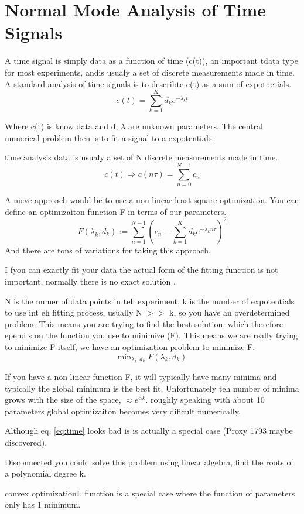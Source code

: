 \documentclass{article}
\newcommand{\be}{\begin{equation}}
\newcommand{\ee}{\end{equation}}
\begin{document}
\section{Normal Mode Analysis of Time Signals}
A time signal is simply data as a function of time (c(t)), an important tdata type for most experiments,
andis usualy a set of discrete measurements made in time.
A standard analysis of time signals is to describte c(t) as a sum of expotnetials.
\be\label{eq:time}
c(t) = \sum_{k=1}^K d_k e^{-\lambda_kt}
\ee

Where c(t) is know data and d, $\lambda$ are unknown parameters.
The central numerical problem then is to fit a signal to a expotentials.

time analysis data is usualy a set of N discrete measurements made in time.
\be
c(t) \Rightarrow c(n\tau) = \sum_{n=0}^{N-1} c_n
\ee

A nieve approach would be to use a non-linear least square optimization.
You can define an optimizaiton function F in terms of our parameters.
\be
F(\lambda_k,d_k) := \sum_{n=1}^{N-1}\left( c_n - \sum_{k=1}^K d_k e^{-\lambda_kn\tau}  \right)^2
\ee
And there are tons of variations for taking this approach.

I fyou can exactly fit your data the actual form of the fitting function is not important, normally there is no exact solution .

N is the numer of data points in teh experiment, k is the number of expotentials to use int eh fitting process, usually N $>>$ k, so you have an overdetermined problem.
This means you are trying to find the best solution, which therefore epend s on the function you use to minimize (F).
This means we are really trying to minimize F itself, we have an optimization problem to minimize F.
\be
\text{min}_{\lambda_k,d_k}\; F(\lambda_k,d_k)
\ee

If you have a non-linear function F, it will typically have many minima and typically the global minimum is the best fit.
Unfortunately teh number of minima grows with the size of the space, $\approx e^{\alpha k}$.
roughly speaking with about 10 parameters global optimizaiton becomes very dificult numerically.

Although eq. \ref{eq:time} looks bad is is actually a special case (Proxy 1793 maybe discovered).

Disconnected you could solve this problem using linear algebra, find the roots of a polynomial degree k.

convex optimizationL function is a special case where the function of parameters only has 1 minimum.
\end{document}
